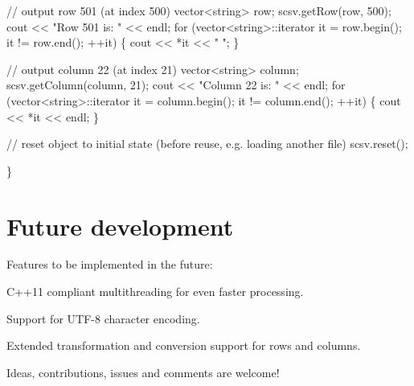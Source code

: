 \begin{DoxyCode}
    \textcolor{comment}{// output row 501 (at index 500)}
    vector<string> row;
    scsv.getRow(row, 500);
    cout << \textcolor{stringliteral}{"Row 501 is: "} << endl;
    \textcolor{keywordflow}{for} (vector<string>::iterator it = row.begin(); it != row.end(); ++it) \{
        cout << *it << \textcolor{stringliteral}{" "};
    \}

    \textcolor{comment}{// output column 22 (at index 21)}
    vector<string> column;
    scsv.getColumn(column, 21);
    cout << \textcolor{stringliteral}{"Column 22 is: "} << endl;
    \textcolor{keywordflow}{for} (vector<string>::iterator it = column.begin(); it != column.end(); ++it) \{
        cout << *it << endl;
    \}

    \textcolor{comment}{// reset object to initial state (before reuse, e.g. loading another file)}
    scsv.reset();

\}
\end{DoxyCode}


\section*{Future development}

Features to be implemented in the future\+:


\begin{DoxyItemize}
\item C++11 compliant multithreading for even faster processing.
\item Support for U\+T\+F-\/8 character encoding.
\item Extended transformation and conversion support for rows and columns.
\end{DoxyItemize}

Ideas, contributions, issues and comments are welcome! 